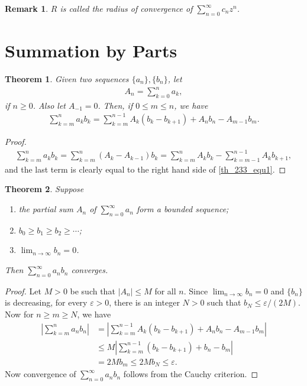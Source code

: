\documentclass[11pt]{book}
\newtheorem{theorem}{Theorem}[chapter]
\newtheorem{remark}{Remark}[chapter]
\theoremstyle{definition}
\numberwithin{equation}{chapter}
\begin{document}
\begin{remark}
$R$ is called the radius of convergence of $\sum^\infty_{n=0} c_n z^n$.
\end{remark}

\medskip


\section{Summation by Parts}

\begin{theorem}
Given two sequences $\{a_n\}, \{b_n\}$, let
\begin{align*}
    A_n = \sum^n_{k=0} a_k,
\end{align*}
if $n \geq 0$. Also let $A_{-1} = 0$. Then, if $0 \leq m \leq n$, we have
\begin{align}\label{th_233_equ1}
    \sum^n_{k=m} a_k b_k = \sum^{n-1}_{k=m} A_k(b_k - b_{k+1}) + A_n b_n - A_{m-1} b_m.
\end{align}
\end{theorem}
\begin{proof}
\begin{align*}
    \sum^n_{k=m} a_k b_k = \sum^n_{k=m} (A_k - A_{k-1}) b_k = \sum^n_{k=m} A_k b_k - \sum^{n-1}_{k=m-1} A_k b_{k+1},
\end{align*}
and the last term is clearly equal to the right hand side of \eqref{th_233_equ1}.
\end{proof}

\medskip

\begin{theorem}\label{th_234}
Suppose
\begin{enumerate}[label=(\alph*)]
    \item the partial sum $A_n$ of $\sum^\infty_{n=0} a_n$ form a bounded sequence;
    
    \item $b_0 \geq b_1 \geq b_2 \geq \cdots$;
    
    \item $\lim_{n\to\infty} b_n = 0$.
\end{enumerate}
Then $\sum^\infty_{n=0} a_n b_n$ converges.
\end{theorem}
\begin{proof}
Let $M > 0$ be such that $\left|A_n\right| \leq M$ for all $n$. Since $\lim_{n\to\infty} b_n = 0$ and $\{b_n\}$ is decreasing, for every $\varepsilon > 0$, there is an integer $N > 0$ such that $b_N \leq \varepsilon/(2M)$. Now for $n \geq m \geq N$, we have
\begin{align*}
    \left|\sum^n_{k=m} a_nb_n\right| & = \left|\sum^{n-1}_{k=m} A_k(b_k - b_{k+1}) + A_n b_n - A_{m-1} b_m\right| \\
    & \leq M \left|\sum^{n-1}_{k=m} (b_k - b_{k+1}) + b_n - b_m\right| \\
    & = 2M b_m \leq 2M b_N \leq \varepsilon.
\end{align*}
Now convergence of $\sum^\infty_{n=0} a_n b_n$ follows from the Cauchy criterion.
\end{proof}
\end{document}
